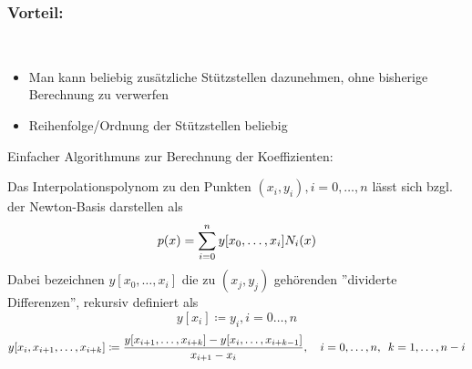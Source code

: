 \subsubsection*{Vorteil:}\hfill\\
\begin{itemize}
    \item Man kann beliebig zusätzliche Stützstellen dazunehmen, ohne bisherige Berechnung zu verwerfen
    \item Reihenfolge/Ordnung der Stützstellen beliebig
\end{itemize}
Einfacher Algorithmuns zur Berechnung der Koeffizienten: 
\begin{theorem}
    Das Interpolationspolynom zu den Punkten $(x_i, y_i), i=0,\dots,n$ lässt sich bzgl. der Newton-Basis
    darstellen als \[
        p(x) = \displaystyle\sum_{i=0}^n y[x_0, \dots, x_i]N_i(x)
    \]
    Dabei bezeichnen $y[x_0, \dots, x_i]$ die zu $(x_j, y_j)$ gehörenden ''dividerte Differenzen'', rekursiv 
    definiert als \[
    y[x_i] \coloneqq y_i, i=0\dots,n
    \]
    \[
    y[x_i, x_{i+1}, \dots, x_{i+k}] \coloneqq \frac{y[x_{i+1}, \dots, x_{i+k}] - y[x_i, \dots, x_{i+k-1}]}{x_{i+1} - x_i}, 
    \quad i=0, \dots, n, \hspace{.5em} k=1, \dots, n-i
    \]
\end{theorem}

